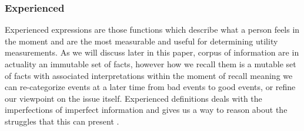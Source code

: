 \documentclass[]{article}
\begin{document}
\subsubsection*{Experienced}
Experienced expressions are those functions which describe what a person feels in the moment and are the most measurable and useful for determining utility measurements. As we will discuss later in this paper, corpus of information are in actuality an immutable set of facts, however how we recall them is a mutable set of facts with associated interpretations within the moment of recall meaning we can re-categorize events at a later time from bad events to good events, or refine our viewpoint on the issue itself. Experienced definitions deals with the imperfections of imperfect information and gives us a way to reason about the struggles that this can present .
\end{document}
